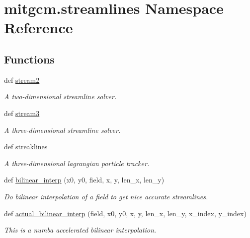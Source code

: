 \hypertarget{namespacemitgcm_1_1streamlines}{}\section{mitgcm.\+streamlines Namespace Reference}
\label{namespacemitgcm_1_1streamlines}
\subsection*{Functions}
\begin{DoxyCompactItemize}
\item 
def \hyperlink{namespacemitgcm_1_1streamlines_ac4d6c763bdac75600b3778f4e0ea3a31}{stream2}
\begin{DoxyCompactList}\small\item\em A two-\/dimensional streamline solver. \end{DoxyCompactList}\item 
def \hyperlink{namespacemitgcm_1_1streamlines_a38690a408e43bb899018203363da090d}{stream3}
\begin{DoxyCompactList}\small\item\em A three-\/dimensional streamline solver. \end{DoxyCompactList}\item 
def \hyperlink{namespacemitgcm_1_1streamlines_a493dab136e4b63582d7f6b77e7a9c644}{streaklines}
\begin{DoxyCompactList}\small\item\em A three-\/dimensional lagrangian particle tracker. \end{DoxyCompactList}\item 
def \hyperlink{namespacemitgcm_1_1streamlines_a4522067d3d52d4fc38a5ec611d776702}{bilinear\+\_\+interp} (x0, y0, field, x, y, len\+\_\+x, len\+\_\+y)
\begin{DoxyCompactList}\small\item\em Do bilinear interpolation of a field to get nice accurate streamlines. \end{DoxyCompactList}\item 
def \hyperlink{namespacemitgcm_1_1streamlines_af0379625b51f588355836dd3711aae7c}{actual\+\_\+bilinear\+\_\+interp} (field, x0, y0, x, y, len\+\_\+x, len\+\_\+y, x\+\_\+index, y\+\_\+index)
\begin{DoxyCompactList}\small\item\em This is a numba accelerated bilinear interpolation. \end{DoxyCompactList}\item 

\end{DoxyCompactItemize}
